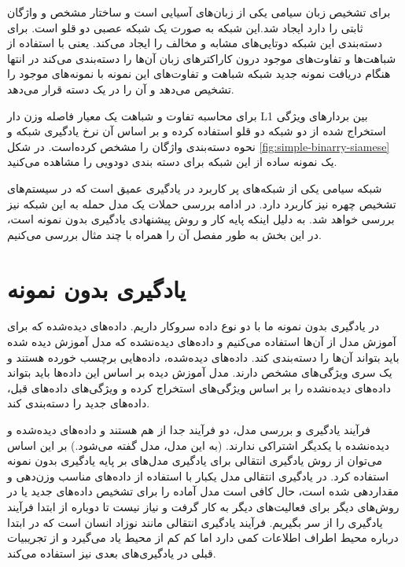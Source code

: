 برای تشخیص زبان سیامی یکی از زبان‌های آسیایی است و ساختار مشخص و واژگان ثابتی را دارد ایجاد شد.این شبکه به صورت یک شبکه عصبی دو قلو است. برای دسته‌بندی این شبکه دوتایی‌های مشابه و مخالف را ایجاد می‌کند. یعنی با استفاده از شباهت‌ها و تفاوت‌های موجود درون کاراکترهای زبان آن‌ها را دسته‌بندی می‌کند در انتها هنگام دریافت نمونه جدید شبکه شباهت و تفاوت‌های این نمونه با نمونه‌های موجود را تشخیص می‌دهد و آن را در یک دسته قرار می‌دهد.

برای محاسبه تفاوت و شباهت یک معیار فاصله وزن دار L1 بین بردار‌های ویژگی استخراج شده از دو شبکه دو قلو استفاده کرده و بر اساس آن نرخ یادگیری شبکه و نحوه دسته‌بندی واژگان را مشخص کرده‌است. در شکل
\ref{fig:simple-binarry-siamese}
یک نمونه ساده از این شبکه برای دسته بندی دودویی را مشاهده می‌کنید.

شبکه سیامی یکی از شبکه‌های پر کاربرد در یادگیری عمیق است که در سیستم‌های تشخیص چهره نیز کاربرد دارد. در ادامه بررسی حملات یک مدل حمله به این شبکه نیز بررسی خواهد شد. به دلیل اینکه پایه کار و روش پیشنهادی یادگیری بدون نمونه است، در این بخش به طور مفصل آن را همراه با چند مثال بررسی می‌کنیم.


\section{یادگیری بدون نمونه}

در یادگیری بدون نمونه ما با دو نوع داده سروکار داریم. داده‌های دیده‌شده که برای آموزش مدل از آن‌ها استفاده می‌کنیم و داده‌های دیده‌نشده که مدل آموزش دیده شده باید بتواند آن‌ها را دسته‌بندی کند. داده‌های دیده‌شده، داده‌هایی برچسب خورده هستند و یک سری ویژگی‌های مشخص دارند. مدل آموزش دیده بر اساس این داده‌ها باید بتواند داده‌های دیده‌نشده را بر اساس ویژگی‌های استخراج کرده و ویژگی‌های داده‌های قبل، داده‌های جدید را دسته‌بندی کند.

فرآیند یادگیری و بررسی مدل، دو فرآیند جدا از هم هستند و داده‌های دیده‌شده و دیده‌نشده با یکدیگر اشتراکی ندارند. (به این مدل، مدل
گفته می‌شود.) بر این اساس می‌توان از روش یادگیری انتقالی برای یادگیری مدل‌های بر پایه یادگیری بدون نمونه استفاده کرد. در یادگیری انتقالی مدل یکبار با استفاده از داده‌های مناسب وزن‌دهی و مقداردهی شده است،‌ حال کافی‌ است مدل آماده را برای تشخیص داده‌های جدید یا در روش‌های دیگر برای فعالیت‌های دیگر به کار گرفت و نیاز نیست تا دوباره از ابتدا فرآیند یادگیری را از سر بگیریم. فرآیند یادگیری انتقالی مانند نوزاد انسان است که در ابتدا درباره محیط اطراف اطلاعات کمی دارد اما کم کم از محیط یاد می‌گیرد و از تجریبیات قبلی در یادگیری‌های بعدی نیز استفاده می‌کند.

